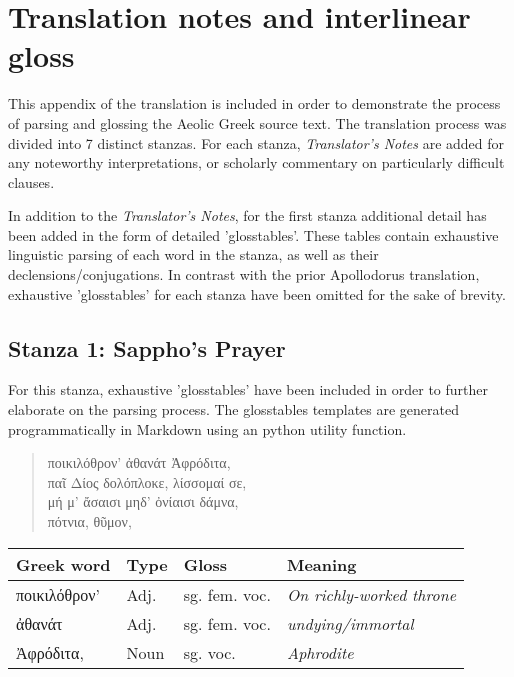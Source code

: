 \section*{Translation notes and interlinear gloss}
This appendix of the translation is included in order to demonstrate the process of parsing and glossing the Aeolic Greek source text. The translation process was divided into 7 distinct stanzas. For each stanza, \emph{Translator's Notes} are added for any noteworthy interpretations, or scholarly commentary on particularly difficult clauses.

In addition to the \emph{Translator's Notes}, for the first stanza additional detail has been added in the form of detailed 'glosstables'. These tables contain exhaustive linguistic parsing of each word in the stanza, as well as their declensions/conjugations. In contrast with the prior Apollodorus translation, exhaustive 'glosstables' for each stanza have been omitted for the sake of brevity.

\subsection*{Stanza 1: Sappho's Prayer}
For this stanza, exhaustive 'glosstables' have been included in order to further elaborate on the parsing process. The glosstables templates are generated programmatically in Markdown using an python utility function. 

\begin{quote}
  ποικιλόθρον’ ἀθανάτ Ἀφρόδιτα,\\
  παῖ Δίος δολόπλοκε, λίσσομαί σε,\\
  μή μ’ ἄσαισι μηδ’ ὀνίαισι δάμνα,\\
  πότνια, θῦμον,\\
\end{quote}

\begin{table}[H]
\begin{tabular}{@{}llll@{}}
\toprule
\textbf{Greek word} & \textbf{Type} & \textbf{Gloss}      & \textbf{Meaning}                 \\ \midrule
ποικιλόθρον'        & Adj.          & sg. fem. voc. & \textit{On richly-worked throne} \\
ἀθανάτ              & Adj.          & sg. fem. voc. & \textit{undying/immortal}        \\
Ἀφρόδιτα,           & Noun          & sg. voc.            & \textit{Aphrodite}               \\ \bottomrule
\end{tabular}
\end{table}

